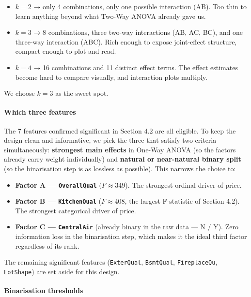 \begin{itemize}
\tightlist
\item
  \(k = 2\) → only 4 combinations, only one possible interaction (AB).
  Too thin to learn anything beyond what Two-Way ANOVA already gave us.
\item
  \(k = 3\) → 8 combinations, three two-way interactions (AB, AC, BC),
  and one three-way interaction (ABC). Rich enough to expose
  joint-effect structure, compact enough to plot and read.
\item
  \(k = 4\) → 16 combinations and 11 distinct effect terms. The effect
  estimates become hard to compare visually, and interaction plots
  multiply.
\end{itemize}

We choose \(k = 3\) as the sweet spot.

\paragraph{Which three features}\label{which-three-features}

The 7 features confirmed significant in Section 4.2 are all eligible. To
keep the design clean and informative, we pick the three that satisfy
two criteria simultaneously: \textbf{strongest main effects} in One-Way
ANOVA (so the factors already carry weight individually) and
\textbf{natural or near-natural binary split} (so the binarisation step
is as lossless as possible). This narrows the choice to:

\begin{itemize}
\tightlist
\item
  \textbf{Factor A --- \texttt{OverallQual}} (\(F \approx 349\)). The
  strongest ordinal driver of price.
\item
  \textbf{Factor B --- \texttt{KitchenQual}} (\(F \approx 408\), the
  largest F-statistic of Section 4.2). The strongest categorical driver
  of price.
\item
  \textbf{Factor C --- \texttt{CentralAir}} (already binary in the raw
  data --- N / Y). Zero information loss in the binarisation step, which
  makes it the ideal third factor regardless of its rank.
\end{itemize}

The remaining significant features (\texttt{ExterQual},
\texttt{BsmtQual}, \texttt{FireplaceQu}, \texttt{LotShape}) are set
aside for this design.

\paragraph{Binarisation thresholds}\label{binarisation-thresholds}

